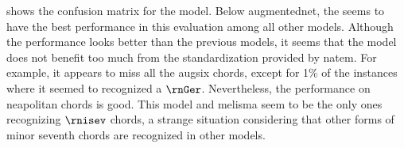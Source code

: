 
 shows the confusion
matrix for the \textcite{mcleod2021modular} model. Below
\gls{augmentednet}, the \textcite{mcleod2021modular} seems
to have the best performance in this evaluation among all
other models. Although the performance looks better than the
previous models, it seems that the model does not benefit
too much from the standardization provided by \gls{natem}.
For example, it appears to miss all the \gls{augsix} chords,
except for 1\% of the instances where it seemed to
recognized a $\rnGer$. Nevertheless, the performance on
\gls{neapolitan} chords is good. This model and
\gls{melisma} seem to be the only ones recognizing $\rnisev$
chords, a strange situation considering that other forms of
minor seventh chords are recognized in other models.

